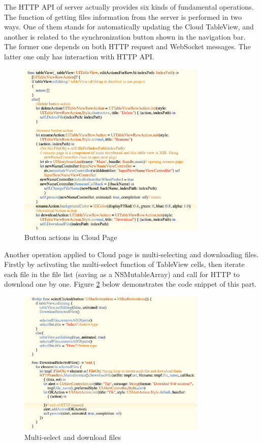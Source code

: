 \documentclass{article}
\begin{document}
The HTTP API of server actually provides six kinds of fundamental operations. The function of getting files information from the server is performed in two ways. One of them stands for automatically updating the Cloud TableView, and another is related to the synchronization button shown in the navigation bar. The former one depends on both HTTP request and WebSocket messages. The latter one only has interaction with HTTP API. 

\begin{figure}[H]
\begin{center}
\includegraphics[width=9cm]{32.png}
\end{center}
\caption{Button actions in Cloud Page}\label{ex4}
\end{figure}

Another operation applied to Cloud page is multi-selecting and downloading files. Firstly by activating the multi-select function of TableView cells, then iterate each file in the file list (saving as a NSMutableArray) and call for HTTP to download one by one. Figure \ref{47} below demonstrates the code snippet of this part. 

\begin{figure}[H]
\begin{center}
\includegraphics[width=9cm]{35.png}
\end{center}
\caption{Multi-select and download files}\label{47}
\end{figure}
\end{document}
